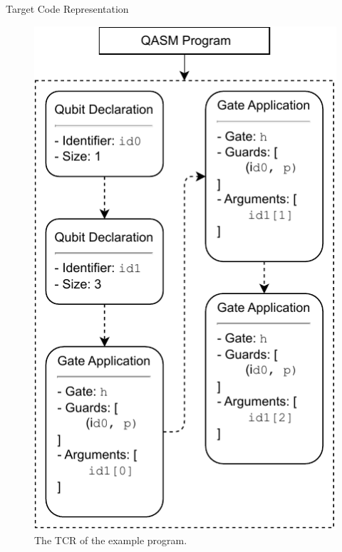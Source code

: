 \begin{frame}{Target Code Representation}
\begin{minipage}{.28\textwidth}
\begin{figure}[htp]
            \includegraphics[width=\textwidth]{../figures/drawio/slides/codeGen_targetCode_example.pdf}
            \caption{The TCR of the example program.}
        \end{figure}
    \end{minipage}
\end{frame}

